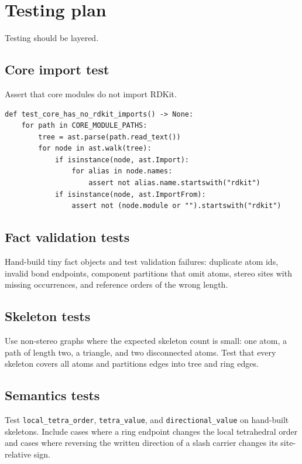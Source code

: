 \documentclass[10pt,a4paper]{article}
\theoremstyle{definition}
\theoremstyle{remark}
\begin{document}
\section{Testing plan}
\label{s:testing}

Testing should be layered.

\subsection{Core import test}

Assert that core modules do not import RDKit.

\begin{lstlisting}
def test_core_has_no_rdkit_imports() -> None:
    for path in CORE_MODULE_PATHS:
        tree = ast.parse(path.read_text())
        for node in ast.walk(tree):
            if isinstance(node, ast.Import):
                for alias in node.names:
                    assert not alias.name.startswith("rdkit")
            if isinstance(node, ast.ImportFrom):
                assert not (node.module or "").startswith("rdkit")
\end{lstlisting}

\subsection{Fact validation tests}

Hand-build tiny fact objects and test validation failures: duplicate atom ids,
invalid bond endpoints, component partitions that omit atoms, stereo sites with
missing occurrences, and reference orders of the wrong length.

\subsection{Skeleton tests}

Use non-stereo graphs where the expected skeleton count is small: one atom, a
path of length two, a triangle, and two disconnected atoms.  Test that every
skeleton covers all atoms and partitions edges into tree and ring edges.

\subsection{Semantics tests}

Test \texttt{local\_tetra\_order}, \texttt{tetra\_value}, and
\texttt{directional\_value} on hand-built skeletons.  Include cases where a ring
endpoint changes the local tetrahedral order and cases where reversing the
written direction of a slash carrier changes its site-relative sign.
\end{document}
